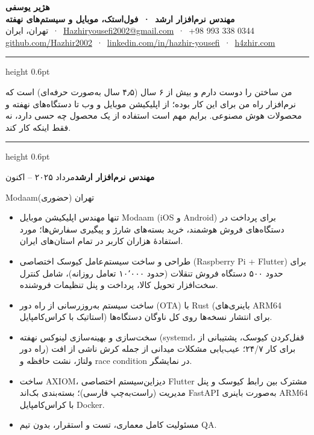 \documentclass[10pt,a4paper]{article}
\newcommand{\en}[1]{\textenglish{#1}}
\renewcommand{\section}[1]{%
  \vspace{6pt}{\bfseries\color{accent}#1}\par\nointerlineskip\vspace{1.5pt}%
  {\color{accent}\hrule height 0.6pt}\vspace{3pt}}
\newcommand{\entry}[4]{%
  \vspace{3pt}\textbf{#1}\hfill #3\par
  #2\hfill #4\par\vspace{1pt}}
\begin{document}
\begin{center}
  {\fontsize{22}{26}\selectfont\bfseries هژیر یوسفی}\\[3pt]
  {\color{accent}\bfseries مهندس نرم‌افزار ارشد \,·\, فول‌استک، موبایل و سیستم‌های نهفته}\\[3pt]
  {\small تهران، ایران \,·\, 
  \en{\href{mailto:Hazhiryousefi2002@gmail.com}{Hazhiryousefi2002@gmail.com}} \,·\,
  \en{+98 993 338 0344}}\\[1pt]
  {\small \en{\href{https://github.com/Hazhir2002}{github.com/Hazhir2002}} \,·\,
  \en{\href{https://linkedin.com/in/hazhir-yousefi-665906232}{linkedin.com/in/hazhir-yousefi}} \,·\,
  \en{\href{https://h4zhir.com}{h4zhir.com}}}
\end{center}

\section{خلاصه}
من ساختن را دوست دارم و بیش از ۶ سال (۴٫۵ سال به‌صورت حرفه‌ای) است که نرم‌افزار راه من برای این کار بوده؛
از اپلیکیشن موبایل و وب تا دستگاه‌های نهفته و محصولات هوش مصنوعی. برایم مهم است استفاده از یک محصول چه حسی دارد، نه فقط اینکه کار کند.

\section{سوابق کاری}

\entry{مهندس نرم‌افزار ارشد}{\en{Modaam}}{مرداد ۲۰۲۵ – اکنون}{تهران (حضوری)}
\begin{itemize}
  \item تنها مهندس اپلیکیشن موبایل \en{Modaam} (\en{iOS} و \en{Android}) برای پرداخت در دستگاه‌های فروش هوشمند، خرید بسته‌های شارژ
        و پیگیری سفارش‌ها؛ مورد استفادهٔ هزاران کاربر در تمام استان‌های ایران.
  \item طراحی و ساخت سیستم‌عامل کیوسک اختصاصی (\en{Raspberry Pi + Flutter}) برای حدود ۵۰۰ دستگاه فروش تنقلات
        (حدود ۱۰٬۰۰۰ تعامل روزانه)، شامل کنترل سخت‌افزار تحویل کالا، پرداخت و پنل تنظیمات فروشنده.
  \item ساخت سیستم به‌روزرسانی از راه دور (\en{OTA}) با \en{Rust} (باینری‌های \en{ARM64} استاتیک با کراس‌کامپایل) برای انتشار
        نسخه‌ها روی کل ناوگان دستگاه‌ها.
  \item سخت‌سازی و بهینه‌سازی لینوکس نهفته (\en{systemd}، قفل‌کردن کیوسک، پشتیبانی از راه دور) برای کار ۲۴/۷؛ عیب‌یابی مشکلات میدانی
        از جمله کرش ناشی از افت ولتاژ، نشت حافظه و \en{race condition} در نمایشگر.
  \item ساخت \en{AXIOM}، دیزاین‌سیستم اختصاصی \en{Flutter} مشترک بین رابط کیوسک و پنل مدیریت (راست‌به‌چپ فارسی)؛
        بسته‌بندی بک‌اند \en{FastAPI} به‌صورت باینری \en{ARM64} با کراس‌کامپایل \en{Docker}.
  \item مسئولیت کامل معماری، تست و استقرار، بدون تیم \en{QA}.
\end{itemize}
\end{document}
